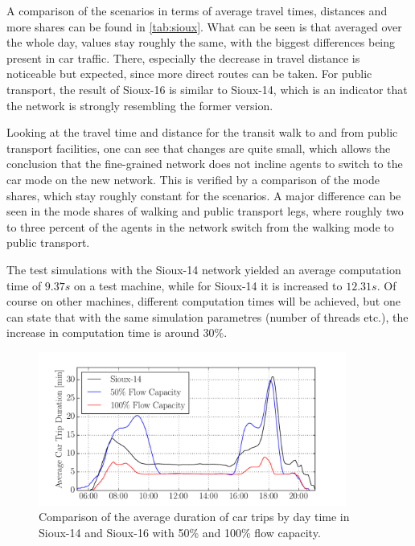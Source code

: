 A comparison of the scenarios in terms of average travel times, distances and more
shares can be found in \cref{tab:sioux}. What can be seen is that averaged over
the whole day, values stay roughly the same, with the biggest differences being
present in car traffic. There, especially the decrease in travel distance is
noticeable but expected, since more direct routes can be taken.
For public transport, the result of Sioux-16 is similar to Sioux-14, which is
an indicator that the network is strongly resembling the former version.

Looking at the travel time and distance for the transit walk to and from public
transport facilities, one can see that changes are quite small, which allows the
conclusion that the fine-grained network does not incline agents to switch to the
car mode on the new network. This is verified by a comparison of the mode shares,
which stay roughly constant for the scenarios. A major difference can be seen in
the mode shares of walking and public transport legs, where roughly two to three
percent of the agents in the network switch from the walking mode to public
transport.

The test simulations with the Sioux-14 network yielded an average computation time
of $9.37s$ on a test machine, while for Sioux-14 it is increased to $12.31s$. Of
course on other machines, different computation times will be achieved, but one
can state that with the same simulation parametres (number of threads etc.), the
increase in computation time is around $30\%$.

\begin{figure}
    \centering
    \includegraphics[width=0.9\textwidth]{figures/sioux_times.pdf}
    \caption{Comparison of the average duration of car trips by day time in Sioux-14 and Sioux-16 with 50\% and 100\% flow capacity.}
    \label{fig:sioux_times}
\end{figure}

